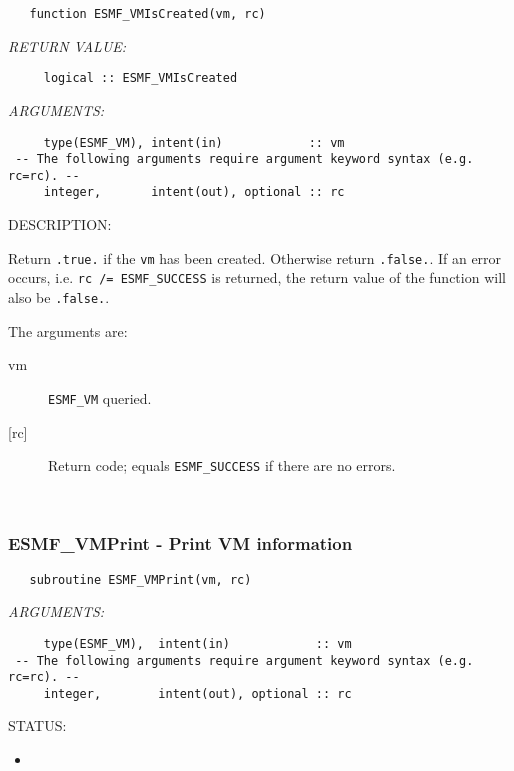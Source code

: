  
\begin{verbatim}   function ESMF_VMIsCreated(vm, rc)\end{verbatim}{\em RETURN VALUE:}
\begin{verbatim}     logical :: ESMF_VMIsCreated\end{verbatim}{\em ARGUMENTS:}
\begin{verbatim}     type(ESMF_VM), intent(in)            :: vm
 -- The following arguments require argument keyword syntax (e.g. rc=rc). --
     integer,       intent(out), optional :: rc
 \end{verbatim}
{\sf DESCRIPTION:\\ }


     Return {\tt .true.} if the {\tt vm} has been created. Otherwise return 
     {\tt .false.}. If an error occurs, i.e. {\tt rc /= ESMF\_SUCCESS} is 
     returned, the return value of the function will also be {\tt .false.}.
  
   The arguments are:
     \begin{description}
     \item[vm]
       {\tt ESMF\_VM} queried.
     \item[{[rc]}]
       Return code; equals {\tt ESMF\_SUCCESS} if there are no errors.
     \end{description}
   
 
\mbox{}\hrulefill\ 
 
\subsubsection [ESMF\_VMPrint] {ESMF\_VMPrint - Print VM information}


 
\begin{verbatim}   subroutine ESMF_VMPrint(vm, rc)\end{verbatim}{\em ARGUMENTS:}
\begin{verbatim}     type(ESMF_VM),  intent(in)            :: vm
 -- The following arguments require argument keyword syntax (e.g. rc=rc). --
     integer,        intent(out), optional :: rc           \end{verbatim}
{\sf STATUS:}
   \begin{itemize}
   \item{}
   \end{itemize}
  
